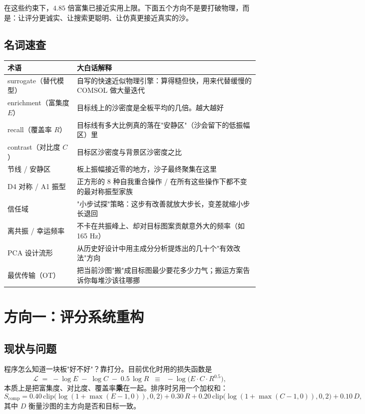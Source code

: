 \documentclass[11pt,a4paper]{article}
\begin{document}
在这些约束下，$4.85$ 倍富集已接近实用上限。下面五个方向不是要打破物理，而是：让评分更诚实、让搜索更聪明、让仿真更接近真实的沙。

\subsection*{名词速查}

\begin{center}
\small
\begin{tabular}{@{}p{}p{}@{}}
\toprule
术语 & 大白话解释 \\
\midrule
surrogate（替代模型） & 自写的快速近似物理引擎：算得糙但快，用来代替缓慢的 COMSOL 做大量迭代 \\
enrichment（富集度 $E$） & 目标线上的沙密度是全板平均的几倍。越大越好 \\
recall（覆盖率 $R$） & 目标线有多大比例真的落在"安静区"（沙会留下的低振幅区）里 \\
contrast（对比度 $C$） & 目标区沙密度与背景区沙密度之比 \\
节线 / 安静区 & 板上振幅接近零的地方，沙子最终聚集在这里 \\
D4 对称 / A1 振型 & 正方形的 8 种自我重合操作 / 在所有这些操作下都不变的最对称振型家族 \\
信任域 & "小步试探"策略：这步有改善就放大步长，变差就缩小步长退回 \\
离共振 / 幸运频率 & 不卡在共振峰上、却对目标图案贡献意外大的频率（如 165 Hz） \\
PCA 设计流形 & 从历史好设计中用主成分分析提炼出的几十个"有效改法"方向 \\
最优传输（OT） & 把当前沙图"搬"成目标图最少要花多少力气；搬运方案告诉你每堆沙该往哪挪 \\
\bottomrule
\end{tabular}
\end{center}

\section{方向一：评分系统重构}

\subsection{现状与问题}

程序怎么知道一块板"好不好"？靠打分。目前优化时用的损失函数是
\begin{equation}
\mathcal{L} \;=\; -\log E \;-\; \log C \;-\; 0.5\,\log R
\;\;\equiv\;\; -\log\!\bigl(E\cdot C\cdot R^{0.5}\bigr),
\end{equation}
本质上是把富集度、对比度、覆盖率\textbf{乘}在一起。排序时另用一个加权和：
\begin{equation}
S_{\mathrm{comp}} = 0.40\,\mathrm{clip}\bigl(\log(1{+}\max(E{-}1,0)),0,2\bigr) + 0.30\,R + 0.20\,\mathrm{clip}\bigl(\log(1{+}\max(C{-}1,0)),0,2\bigr) + 0.10\,D,
\end{equation}
其中 $D$ 衡量沙图的主方向是否和目标一致。
\end{document}
